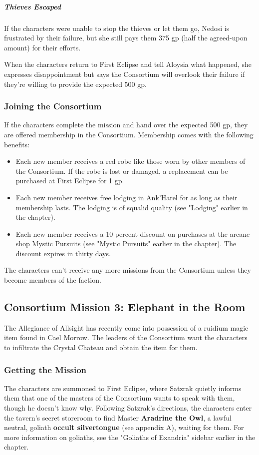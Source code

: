 \documentclass[10pt,a4paper,twoside,bg=print,twocolumn,openany,nodeprecatedcode]{dndbook}
\begin{document}
\subparagraph{Thieves Escaped}
If the characters were unable to stop the thieves or let them go, Nedosi is frustrated by their failure, but she still pays them 375 gp (half the agreed-upon amount) for their efforts.

When the characters return to First Eclipse and tell Aloysia what happened, she expresses disappointment but says the Consortium will overlook their failure if they're willing to provide the expected 500 gp.

\subsubsection{Joining the Consortium}
If the characters complete the mission and hand over the expected 500 gp, they are offered membership in the Consortium. Membership comes with the following benefits:


\begin{itemize}
\item Each new member receives a red robe like those worn by other members of the Consortium. If the robe is lost or damaged, a replacement can be purchased at First Eclipse for 1 gp.
\item Each new member receives free lodging in Ank'Harel for as long as their membership lasts. The lodging is of squalid quality (see "Lodging" earlier in the chapter).
\item Each new member receives a 10 percent discount on purchases at the arcane shop Mystic Pursuits (see "Mystic Pursuits" earlier in the chapter). The discount expires in thirty days.
\end{itemize}

The characters can't receive any more missions from the Consortium unless they become members of the faction.

\subsection{Consortium Mission 3: Elephant in the Room}
The Allegiance of Allsight has recently come into possession of a ruidium magic item found in Cael Morrow. The leaders of the Consortium want the characters to infiltrate the Crystal Chateau and obtain the item for them.

\subsubsection{Getting the Mission}
The characters are summoned to First Eclipse, where Satzrak quietly informs them that one of the masters of the Consortium wants to speak with them, though he doesn't know why. Following Satzrak's directions, the characters enter the tavern's secret storeroom to find Master \textbf{Aradrine the Owl}, a lawful neutral, goliath \textbf{occult silvertongue} (see appendix A), waiting for them. For more information on goliaths, see the "Goliaths of Exandria" sidebar earlier in the chapter.
\end{document}
